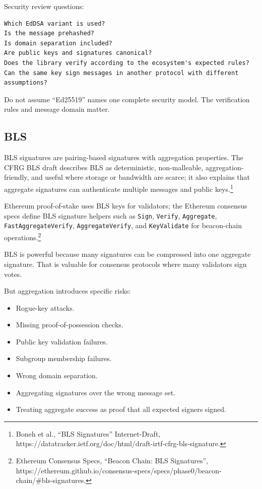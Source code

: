 Security review questions:

\begin{lstlisting}
Which EdDSA variant is used?
Is the message prehashed?
Is domain separation included?
Are public keys and signatures canonical?
Does the library verify according to the ecosystem's expected rules?
Can the same key sign messages in another protocol with different assumptions?
\end{lstlisting}

Do not assume ``Ed25519'' names one complete security model. The
verification rules and message domain matter.

\subsection{BLS}

BLS signatures are pairing-based signatures with aggregation properties.
The CFRG BLS draft describes BLS as deterministic, non-malleable,
aggregation-friendly, and useful where storage or bandwidth are scarce;
it also explains that aggregate signatures can authenticate multiple
messages and public keys.\footnote{Boneh et al., ``BLS Signatures''
  Internet-Draft,
  https://datatracker.ietf.org/doc/html/draft-irtf-cfrg-bls-signature.}

Ethereum proof-of-stake uses BLS keys for validators; the Ethereum
consensus specs define BLS signature helpers such as
\passthrough{\lstinline!Sign!}, \passthrough{\lstinline!Verify!},
\passthrough{\lstinline!Aggregate!},
\passthrough{\lstinline!FastAggregateVerify!},
\passthrough{\lstinline!AggregateVerify!}, and
\passthrough{\lstinline!KeyValidate!} for beacon-chain
operations.\footnote{Ethereum Consensus Specs, ``Beacon Chain: BLS
  Signatures'',
  https://ethereum.github.io/consensus-specs/specs/phase0/beacon-chain/\#bls-signatures.}

BLS is powerful because many signatures can be compressed into one
aggregate signature. That is valuable for consensus protocols where many
validators sign votes.

But aggregation introduces specific risks:

\begin{itemize}
\tightlist
\item
  Rogue-key attacks.
\item
  Missing proof-of-possession checks.
\item
  Public key validation failures.
\item
  Subgroup membership failures.
\item
  Wrong domain separation.
\item
  Aggregating signatures over the wrong message set.
\item
  Treating aggregate success as proof that all expected signers signed.
\end{itemize}

